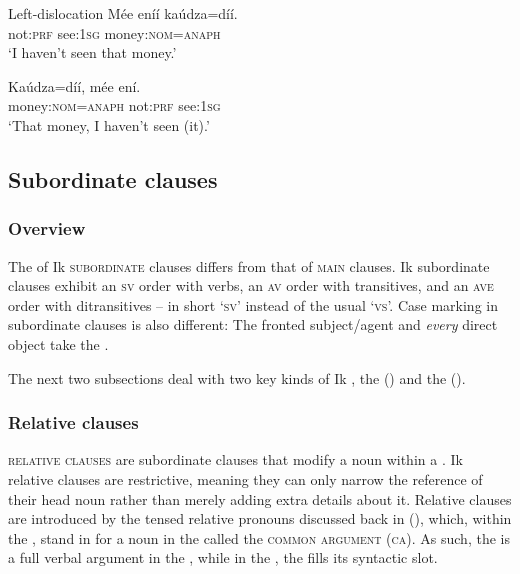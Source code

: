 Left-dislocation
\ea\label{ex:syn:33}
\gll Mée   eníí     kaúdza=díí. \\
not:\textsc{prf}   see:\textsc{1sg}   money:\textsc{nom}=\textsc{anaph}    \\
\glt ‘I haven’t seen that money.’ 
\z




\ea\label{ex:syn:34}
\gll Kaúdza=díí,     mée     ení. \\
money:\textsc{nom}=\textsc{anaph}   not:\textsc{prf}   see:\textsc{1sg}    \\
\glt ‘That money, I haven’t seen (it).’ 
\z






\subsection{Subordinate clauses}\label{sec:10.3}
\subsubsection{Overview}\label{sec:10.3.1}

The  of Ik \textsc{subordinate} clauses differs from that of \textsc{main} clauses. Ik subordinate clauses exhibit an \textsc{sv} order with  verbs, an \textsc{av} order with transitives, and an \textsc{ave} order with ditransitives – in short ‘\textsc{sv}’ instead of the usual ‘\textsc{vs}’. Case marking in subordinate clauses is also different: The fronted subject/agent and \textit{every} direct object take the . 

The next two subsections deal with two key kinds of Ik , the  () and the  ().


\subsubsection{Relative clauses}\label{sec:10.3.2}

\textsc{relative clauses} are subordinate clauses that modify a noun within a . Ik relative clauses are restrictive, meaning they can only narrow the reference of their head noun rather than merely adding extra details about it. Relative clauses are introduced by the tensed relative pronouns discussed back in (), which, within the , stand in for a noun in the  called the \textsc{common argument} (\textsc{ca}). As such, the  is a full verbal argument in the , while in the , the  fills its syntactic slot.

